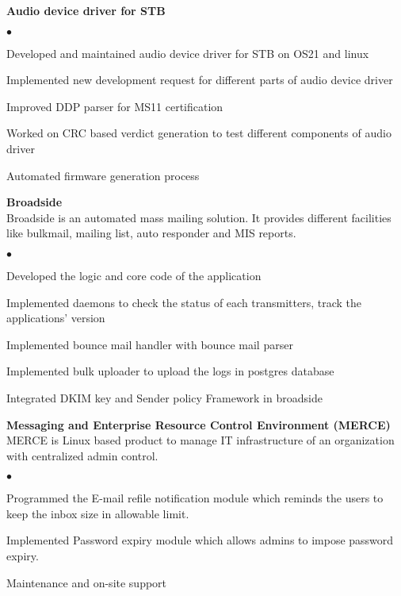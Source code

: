 \documentclass[margin,line]{res}
\newcommand{\datesection}[1]{\section{\textnormal{\scriptsize \textcolor{subtle}{#1}}}}
\newenvironment{list2}{
  \begin{list}{$\bullet$}{%
      \setlength{\itemsep}{0in}
      \setlength{\parsep}{0in} \setlength{\parskip}{0in}
      \setlength{\topsep}{0in} \setlength{\partopsep}{0in}
      \setlength{\leftmargin}{0.2in}}}{\end{list}}
\begin{document}
\begin{resume}
{\bf Audio device driver for STB}\\
\begin{list2}
\item Developed and maintained audio device driver for STB on OS21 and linux
\item Implemented new development request for different parts of audio device driver
\item Improved DDP parser for MS11 certification
\item Worked on CRC based verdict generation to test different components of audio driver
\item Automated firmware generation process
\end{list2}

{\bf Broadside} \\
Broadside is an automated mass mailing solution. It provides different facilities
like bulkmail, mailing list, auto responder and MIS reports.\\
\begin{list2}
\item Developed the logic and core code of the application
\item Implemented daemons to check the status of each transmitters, track the applications’ version
\item Implemented bounce mail handler with bounce mail parser
\item Implemented bulk uploader to upload the logs in postgres database
\item Integrated DKIM key and Sender policy Framework in broadside
\end{list2}

{\bf  Messaging and Enterprise Resource Control Environment (MERCE)}\\
MERCE is Linux based product to manage IT infrastructure of an organization with centralized admin control.\\
\begin{list2}
\item Programmed the E-mail refile notification module which reminds the users
to keep the inbox size in allowable limit.
\item Implemented Password expiry module which allows admins to impose password expiry.
\item Maintenance and on-site support
\end{list2}


\end{resume}
\end{document}
